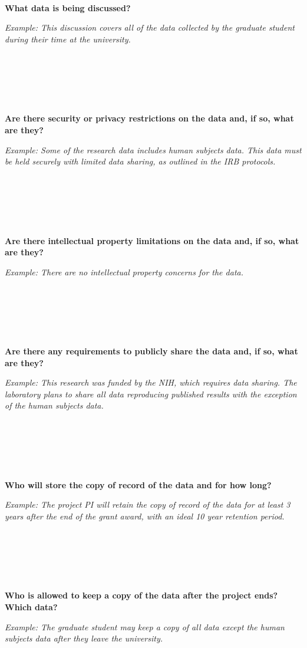 \documentclass[
]{book}
\begin{document}
~

~

~

\textbf{What data is being discussed?}

\emph{Example: This discussion covers all of the data collected by the graduate student during their time at the university.}

~

~

~

\textbf{Are there security or privacy restrictions on the data and, if so, what are they?}

\emph{Example: Some of the research data includes human subjects data. This data must be held securely with limited data sharing, as outlined in the IRB protocols.}

~

~

~

\textbf{Are there intellectual property limitations on the data and, if so, what are they?}

\emph{Example: There are no intellectual property concerns for the data.}

~

~

~

\textbf{Are there any requirements to publicly share the data and, if so, what are they?}

\emph{Example: This research was funded by the NIH, which requires data sharing. The laboratory plans to share all data reproducing published results with the exception of the human subjects data.}

~

~

~

\textbf{Who will store the copy of record of the data and for how long?}

\emph{Example: The project PI will retain the copy of record of the data for at least 3 years after the end of the grant award, with an ideal 10 year retention period.}

~

~

~

\textbf{Who is allowed to keep a copy of the data after the project ends? Which data?}

\emph{Example: The graduate student may keep a copy of all data except the human subjects data after they leave the university.}

~
\end{document}
